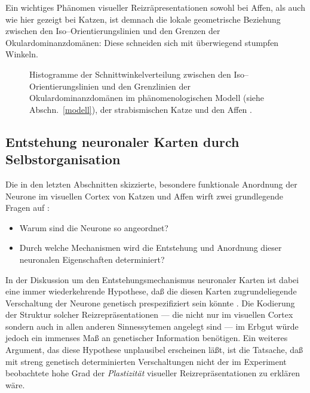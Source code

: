 Ein wichtiges Phänomen visueller Reizräpresentationen sowohl bei Affen,
als auch wie hier gezeigt bei Katzen, ist demnach die lokale geometrische
Beziehung zwischen den Iso--Orientierungslinien und den Grenzen der
Okulardominanzdomänen: Diese schneiden sich mit überwiegend stumpfen
Winkeln.

\begin{figure}[t]
\begin{center}
\end{center}
\caption{Histogramme der Schnittwinkelverteilung zwischen den
Iso--Orien\-tier\-ungs\-linien und den Grenzlinien der Okulardominanzdomänen
im phänomenologischen Modell (siehe Abschn.~\ref{modell}), der
strabismischen Katze \protect{} und den Affen
\protect{}.}
\label{odop_hist}
\end{figure}

\subsection{Entstehung neuronaler Karten durch Selbstorganisation}
\label{plastizitaet}

Die in den letzten Abschnitten skizzierte, besondere funktionale Anordnung
der Neurone im visuellen Cortex von Katzen und Affen wirft zwei
grundlegende Fragen auf \cite{marlsburg:1973}:

\begin{itemize}
\item Warum sind die Neurone so angeordnet?
\item Durch welche Mechanismen wird die Entstehung und Anordnung dieser
neuronalen Eigenschaften determiniert?
\end{itemize}

In der Diskussion um den Entstehungsmechanismus neuronaler Karten ist dabei
eine immer wiederkehrende Hypothese, daß die diesen Karten
zugrundeliegende Verschaltung der Neurone genetisch prespezifiziert sein
könnte . Die Kodierung der
Struktur solcher Reizrepräsentationen --- die nicht nur im visuellen
Cortex sondern auch in allen anderen Sinnessytemen angelegt sind --- im
Erbgut würde jedoch ein immenses Maß an genetischer Information
benötigen.  Ein weiteres Argument, das diese Hypothese unplausibel
erscheinen läßt, ist die Tatsache, daß mit streng genetisch
determinierten Verschaltungen nicht der im Experiment beobachtete hohe Grad
der \emph{Plastizität} visueller Reizrepräsentationen zu erklären wäre.

